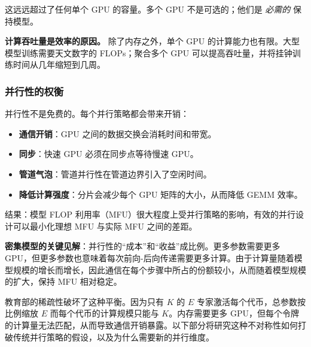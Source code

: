 这远远超过了任何单个 GPU 的容量。多个 GPU 不是可选的；他们是 \emph{必需的} 保持模型。

\textbf{计算吞吐量是效率的原因。} 除了内存之外，单个 GPU 的计算能力也有限。大型模型训练需要天文数字的 FLOPs；聚合多个 GPU 可以提高吞吐量，并将挂钟训练时间从几年缩短到几周。

\subsubsection{并行性的权衡}

并行性不是免费的。每个并行策略都会带来开销：

\begin{itemize}
    \item \textbf{通信开销}：GPU 之间的数据交换会消耗时间和带宽。
    \item \textbf{同步}：快速 GPU 必须在同步点等待慢速 GPU。
    \item \textbf{管道气泡}：管道并行性在管道边界引入了空闲时间。
    \item \textbf{降低计算强度}：分片会减少每个 GPU 矩阵的大小，从而降低 GEMM 效率。
\end{itemize}

结果：模型 FLOP 利用率（MFU）很大程度上受并行策略的影响，有效的并行设计可以最小化理想 MFU 与实际 MFU 之间的差距。

\textbf{密集模型的关键见解}：并行性的“成本”和“收益”成比例。更多参数需要更多 GPU，但更多参数也意味着每次前向-后向传递需要更多计算。由于计算量随着模型规模的增长而增长，因此通信在每个步骤中所占的份额较小，从而随着模型规模的扩大，保持 MFU 相对稳定。

教育部的稀疏性破坏了这种平衡。因为只有 $K$ 的 $E$ 专家激活每个代币，总参数按比例缩放 $E$ 而每个代币的计算规模只能与 $K$。内存需要更多 GPU，但每个令牌的计算量无法匹配，从而导致通信开销暴露。以下部分将研究这种不对称性如何打破传统并行策略的假设，以及为什么需要新的并行维度。

